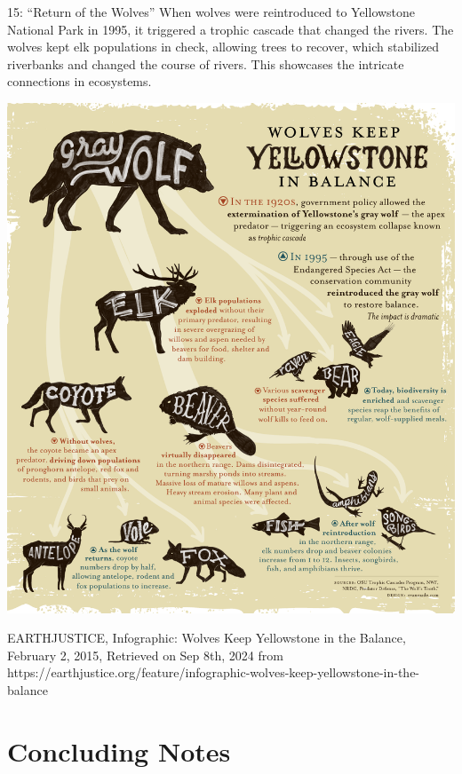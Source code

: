 \documentclass[
  ignorenonframetext,
]{beamer}
\begin{document}
\begin{frame}{15: ``Return of the Wolves''}
\label{return-of-the-wolves}
When wolves were reintroduced to Yellowstone National Park in 1995, it
triggered a trophic cascade that changed the rivers. The wolves kept elk
populations in check, allowing trees to recover, which stabilized
riverbanks and changed the course of rivers. This showcases the
intricate connections in ecosystems.
\end{frame}

\begin{frame}{}
\label{section}
\includegraphics[width=\textwidth,height=0.8\textheight]{L2_files/mediabag/infographic-wolves_1.png}

EARTHJUSTICE, Infographic: Wolves Keep Yellowstone in the Balance,
February 2, 2015, Retrieved on Sep 8th, 2024 from
https://earthjustice.org/feature/infographic-wolves-keep-yellowstone-in-the-balance
\end{frame}

\section{Concluding Notes}\label{concluding-notes}
\end{document}
